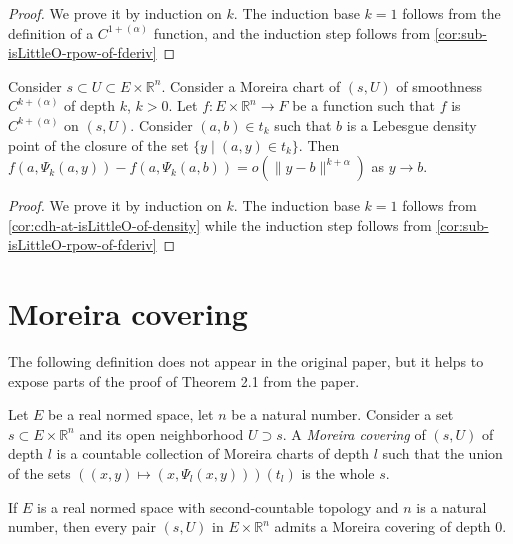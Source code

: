 \begin{proof}
  We prove it by induction on \(k\).
  The induction base \(k = 1\) follows from the definition of a \(C^{1+(\alpha)}\) function,
  and the induction step follows from \autoref{cor:sub-isLittleO-rpow-of-fderiv}
\end{proof}

\begin{theorem}%
  \label{thm:moreira-chart-isLittleO}
  Consider \(s\subset U\subset E\times\mathbb R^{n}\).
  Consider a Moreira chart of \((s, U)\) of smoothness \(C^{k+(\alpha)}\) of depth \(k\), \(k > 0\).
  Let \(f\colon E\times\mathbb R^{n}\to F\) be a function
  such that \(f\) is \(C^{k+(\alpha)}\) on \((s, U)\).
  Consider \((a, b)\in t_{k}\) such that \(b\) is a Lebesgue density point of the closure of the set \(\{y\mid (a, y)\in t_{k}\}\).
  Then \(f(a, \Psi_{k}(a, y)) - f(a, \Psi_{k}(a, b))=o\left(\|y - b\|^{k + \alpha}\right)\) as \(y\to b\).
\end{theorem}

\begin{proof}
  We prove it by induction on \(k\).
  The induction base \(k = 1\) follows from \autoref{cor:cdh-at-isLittleO-of-density}
  while the induction step follows from \autoref{cor:sub-isLittleO-rpow-of-fderiv}
\end{proof}

\section{Moreira covering}%
\label{sec:moreira-covering}

The following definition does not appear in the original paper,
but it helps to expose parts of the proof of Theorem 2.1 from the paper.
\begin{definition}%
  \label{def:moreira-covering}
  Let \(E\) be a real normed space, let \(n\) be a natural number.
  Consider a set \(s\subset E \times \mathbb R^{n}\) and its open neighborhood \(U\supset s\).
  A \emph{Moreira covering} of \((s, U)\) of depth \(l\)
  is a countable collection of Moreira charts of depth \(l\)
  such that the union of the sets \(((x, y) \mapsto (x, \Psi_{l}(x, y)))(t_{l})\) is the whole \(s\).
\end{definition}

\begin{lemma}%
  \label{lem:moreira-covering-zero}
  If \(E\) is a real normed space with second-countable topology and \(n\) is a natural number,
  then every pair \((s, U)\) in \(E\times\mathbb R^{n}\)
  admits a Moreira covering of depth \(0\).
\end{lemma}

